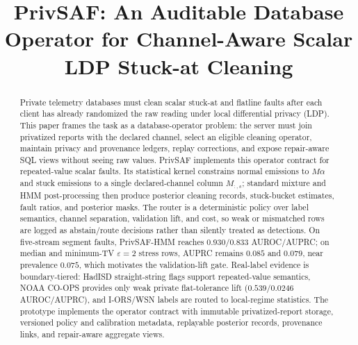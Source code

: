 \documentclass[conference]{IEEEtran}
\begin{document}
\title{PrivSAF: An Auditable Database Operator for Channel-Aware Scalar LDP Stuck-at Cleaning}

\author{
}

\maketitle

\begin{abstract}
Private telemetry databases must clean scalar stuck-at and flatline faults after each client has already randomized the raw reading under local differential privacy (LDP). This paper frames the task as a database-operator problem: the server must join privatized reports with the declared channel, select an eligible cleaning operator, maintain privacy and provenance ledgers, replay corrections, and expose repair-aware SQL views without seeing raw values. PrivSAF implements this operator contract for repeated-value scalar faults. Its statistical kernel constrains normal emissions to \(M\alpha\) and stuck emissions to a single declared-channel column \(M_{:,s}\); standard mixture and HMM post-processing then produce posterior cleaning records, stuck-bucket estimates, fault ratios, and posterior masks. The router is a deterministic policy over label semantics, channel separation, validation lift, and cost, so weak or mismatched rows are logged as abstain/route decisions rather than silently treated as detections. On five-stream segment faults, PrivSAF-HMM reaches \(0.930/0.833\) AUROC/AUPRC; on median and minimum-TV \(\varepsilon=2\) stress rows, AUPRC remains \(0.085\) and \(0.079\), near prevalence \(0.075\), which motivates the validation-lift gate. Real-label evidence is boundary-tiered: HadISD straight-string flags support repeated-value semantics, NOAA CO-OPS provides only weak private flat-tolerance lift (\(0.539/0.0246\) AUROC/AUPRC), and I-ORS/WSN labels are routed to local-regime statistics. The prototype implements the operator contract with immutable privatized-report storage, versioned policy and calibration metadata, replayable posterior records, provenance links, and repair-aware aggregate views.
\end{abstract}
\end{document}

